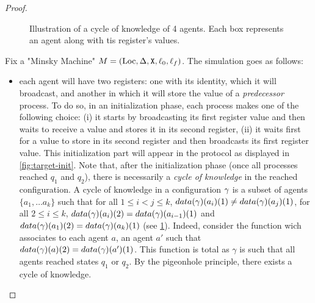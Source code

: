 \begin{proof}
	
	\begin{figure}
		
		\caption{Illustration of a cycle of knowledge of 4 agents. Each box represents an agent along with tis register's values.}\label{fig:target-cycle-knowledge}
	\end{figure}
	
	Fix a "Minsky Machine" $M= (\text{Loc}, \Delta, \mathtt{X}, \ell_0, \ell_f)$. The simulation goes as follows: 
	\begin{itemize}
		\item each agent will have two registers: one with its identity, which it will broadcast, and another in which it will store the value of a \emph{predecessor} process. To do so, in an initialization phase, each process makes one of the following choice: (i) it starts by broadcasting its first register value and then waits to receive a value and stores it in its second register, (ii) it waits first for a value to store in its second register and then broadcasts its first register value. This initialization part will appear in the protocol as displayed in \cref{fig:target-init}. Note that, after the initialization phase (once all processes reached $q_1$ and $q_2$), there is necessarily a \emph{cycle of knowledge} in the reached configuration. A cycle of knowledge in a configuration $\gamma$ is a subset of agents $\{a_1, \dots a_k\}$ such that for all $1 \leq i < j \leq k$, $\data{\config}(a_i)(1) \ne \data{\config}(a_j)(1)$, for all $2 \leq i \leq k$, $\data{\config}(a_i)(2) = \data{\config}(a_{i-1})(1)$ and $\data{\config}(a_1)(2) = \data{\config}(a_{k})(1)$ (see \cref{fig:target-cycle-knowledge}). Indeed, consider the function wich associates to each agent $a$, an agent $a'$ such that $\data{\config}(a)(2) = \data{\config}(a')(1)$. This function is total as $\gamma$ is such that all agents reached states $q_1$ or $q_2$. By the pigeonhole principle, there exists a cycle of knowledge.
		
		

\end{itemize}
\end{proof}

